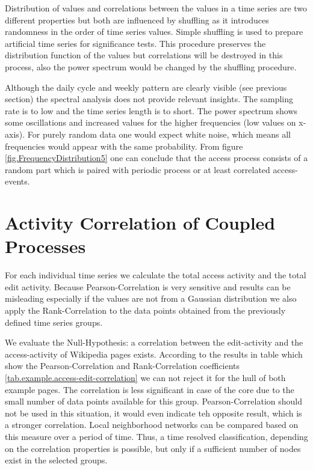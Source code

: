 \documentclass[a4paper,10pt]{scrbook}
\begin{document}
\label{ext.fig.FrequencyDistribution5} 


Distribution of values and correlations between the values in a time series are two different properties but both are influenced by shuffling as it introduces randomness in the order of time series values. Simple shuffling is used to prepare artificial time series for significance tests. This procedure preserves the distribution function of the values but correlations will be destroyed in this process, also the power spectrum would be changed by the shuffling procedure.

Although the daily cycle and weekly pattern are clearly visible (see previous section) the spectral analysis does not provide relevant insights. The sampling rate is to low and the time series length is to short. The power spectrum shows some oscillations and increased values for the higher frequencies (low values on x-axis). For purely random data one would expect white noise, which means all frequencies would appear with the same probability. From figure \ref{fig.FrequencyDistribution5} one can conclude that the access process consists of a random part which is paired with periodic process or at least correlated access-events.

\section{Activity Correlation of Coupled Processes}
For each individual time series we calculate the total access activity and the total edit activity. Because Pearson-Correlation is very sensitive and results can be misleading especially if the values are not from a Gaussian distribution we also apply the Rank-Correlation to the data points obtained from the previously defined time series groups.

We evaluate the Null-Hypothesis: a correlation between the edit-activity and the access-activity of Wikipedia pages exists. According to the results in table which show the Pearson-Correlation and Rank-Correlation coefficients \ref{tab.example.access-edit-correlation} we can not reject it for the hull of both example pages. The correlation is less significant in case of the core due to the small number of data points available for this group. Pearson-Correlation should not be used in this situation, it would even indicate teh opposite result, which is a stronger correlation. Local neighborhood networks can be compared based on this measure over a period of time. Thus, a time resolved classification, depending on the correlation properties is possible, but only if a sufficient number of nodes exist in the selected groups.
  
\end{document}
